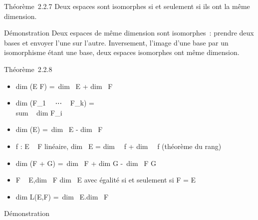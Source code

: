 \documentclass[]{article}
\begin{document}
Théorème~2.2.7 Deux espaces sont isomorphes si et seulement si ils ont
la même dimension.

Démonstration Deux espaces de même dimension sont isomorphes~: prendre
deux bases et envoyer l'une sur l'autre. Inversement, l'image d'une base
par un isomorphisme étant une base, deux espaces isomorphes ont même
dimension.

Théorème~2.2.8

\begin{itemize}
\itemsep1pt\parskip0pt
\item
  dim (E \times F) =\ dim~
  E + dim~ F
\item
  dim (F_1~
  \oplus~⋯ \oplus~ F_k)
  = \\sum ~
  dim F_i~
\item
   dim (E\diagupF) =\ dim~ E
  - dim~ F
\item
  f : E \rightarrow~ F linéaire, dim~ E
  = dim~
  \mathrmKer~f
  + dim~
  \mathrmIm~f (théorème du
  rang)
\item
  dim (F + G) =\ dim~
  F + dim G -\ dim~ F
  \bigcap G
\item
  F \subset~ E,\quad dim~ F
  \leq dim~ E avec égalité si et seulement si F =
  E
\item
  dim L(E,F) =\ dim~
  E.dim~ F
\end{itemize}

Démonstration
\end{document}
